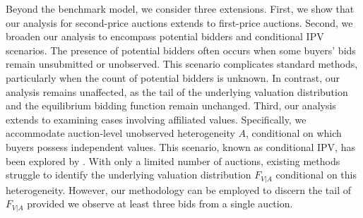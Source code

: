 Beyond the benchmark model, we consider three extensions. 
First, we show that our analysis for second-price auctions extends to first-price auctions. 
Second, we broaden our analysis to encompass potential bidders and conditional IPV scenarios. The presence of potential bidders often occurs when some buyers' bids remain unsubmitted or unobserved. This scenario complicates standard methods, particularly when the count of potential bidders is unknown. In contrast, our analysis remains unaffected, as the tail of the underlying valuation distribution and the equilibrium bidding function remain unchanged. %
Third, our analysis extends to examining cases involving affiliated values. Specifically, we accommodate auction-level unobserved heterogeneity $A$, conditional on which buyers possess independent values. This scenario, known as conditional IPV, has been explored by \citet{li2000cipv}. With only a limited number of auctions, existing methods struggle to identify the underlying valuation distribution $F_{V|A}$ conditional on this heterogeneity. However, our methodology can be employed to discern the tail of $F_{V|A}$ provided we observe at least three bids from a single auction. 





